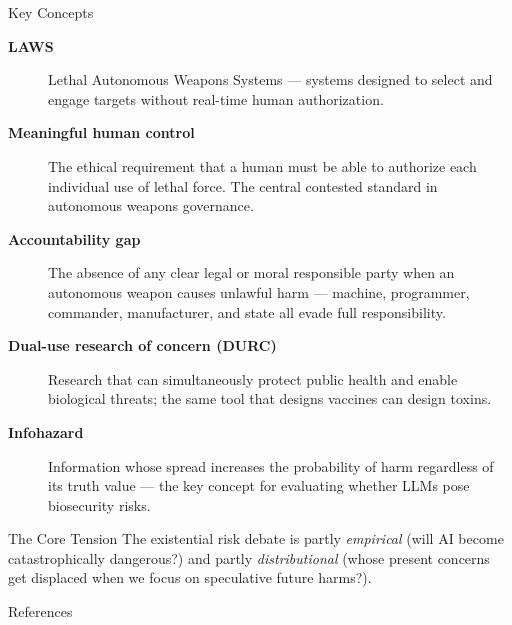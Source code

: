 \documentclass[aspectratio=169,11pt]{beamer}
\begin{document}
\begin{frame}[allowframebreaks]{Key Concepts}
\begin{description}
    \item[\textbf{LAWS}] Lethal Autonomous Weapons Systems --- systems designed to select and engage targets without real-time human authorization.
    \item[\textbf{Meaningful human control}] The ethical requirement that a human must be able to authorize each individual use of lethal force. The central contested standard in autonomous weapons governance.
    \item[\textbf{Accountability gap}] The absence of any clear legal or moral responsible party when an autonomous weapon causes unlawful harm --- machine, programmer, commander, manufacturer, and state all evade full responsibility.
    \item[\textbf{Dual-use research of concern (DURC)}] Research that can simultaneously protect public health and enable biological threats; the same tool that designs vaccines can design toxins.
    \item[\textbf{Infohazard}] Information whose spread increases the probability of harm regardless of its truth value --- the key concept for evaluating whether LLMs pose biosecurity risks.
\end{description}

\begin{alertblock}{The Core Tension}
The existential risk debate is partly \emph{empirical} (will AI become catastrophically dangerous?) and partly \emph{distributional} (whose present concerns get displaced when we focus on speculative future harms?).
\end{alertblock}
\end{frame}

\begin{frame}[allowframebreaks]{References}
\printbibliography[heading=none]
\end{frame}
\end{document}
